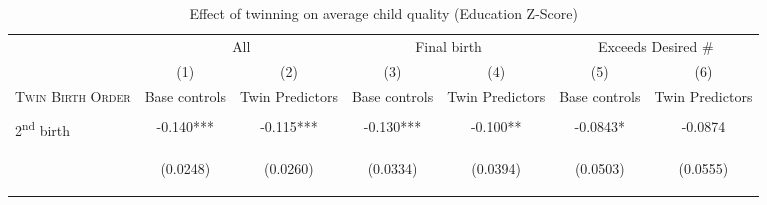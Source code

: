 \documentclass{article}[11pt,subeqn]
\begin{document}
\begin{spacing}{1.5}
\label{sscn:resultsRZ}
\begin{sidewaystable}[!htbp]													
\caption{Effect of twinning on average child quality (Education Z-Score)}													
\vspace{-3mm}													
\label{tab:RZave}													
\begin{center}													
\begin{tabular}{lcccccc} \toprule													
& \multicolumn{2}{c}{All} & \multicolumn{2}{c}{Final birth} & \multicolumn{2}{c}{Exceeds Desired \#} \\ \cmidrule(r){2-3} \cmidrule(r){4-5} \cmidrule(r){6-7}													
& (1) & (2) & (3) & (4) & (5) & (6) \\
\textsc{Twin Birth Order}	&	Base controls	&	Twin Predictors	&	Base controls	&	Twin Predictors	&	Base controls	&	Twin Predictors	\\ \midrule
\begin{footnotesize}\end{footnotesize}&\begin{footnotesize}\end{footnotesize}&\begin{footnotesize}\end{footnotesize}&\begin{footnotesize}\end{footnotesize}&\begin{footnotesize}\end{footnotesize}&\begin{footnotesize}\end{footnotesize}&\begin{footnotesize}\end{footnotesize}\\													
2\textsuperscript{nd} birth	&	-0.140***	&	-0.115***	&	-0.130***	&	-0.100**	&	-0.0843*	&	-0.0874	\\  
\vspace{4pt}	& \begin{footnotesize}	(0.0248)	\end{footnotesize} & \begin{footnotesize}	(0.0260)	\end{footnotesize} & \begin{footnotesize}	(0.0334)	\end{footnotesize} & \begin{footnotesize}	(0.0394)	\end{footnotesize} & \begin{footnotesize}	(0.0503)	\end{footnotesize} & \begin{footnotesize}	(0.0555)	\end{footnotesize} \\

\end{tabular}
\end{center}
\end{sidewaystable}
\end{spacing}
\end{document}
